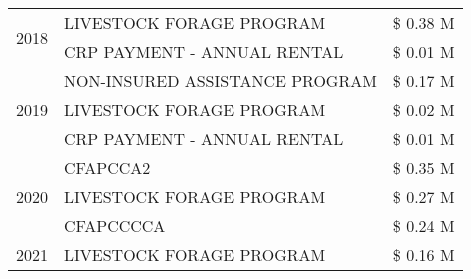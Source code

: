 \begin{tabular}{llr}
\cline{1-3}
\multirow[t]{2}{*}{2018} & LIVESTOCK FORAGE PROGRAM & \$ 0.38 M \\
 & CRP PAYMENT - ANNUAL RENTAL & \$ 0.01 M \\
\cline{1-3}
\multirow[t]{3}{*}{2019} & NON-INSURED ASSISTANCE PROGRAM & \$ 0.17 M \\
 & LIVESTOCK FORAGE PROGRAM & \$ 0.02 M \\
 & CRP PAYMENT - ANNUAL RENTAL & \$ 0.01 M \\
\cline{1-3}
\multirow[t]{3}{*}{2020} & CFAPCCA2 & \$ 0.35 M \\
 & LIVESTOCK FORAGE PROGRAM & \$ 0.27 M \\
 & CFAPCCCCA & \$ 0.24 M \\
\cline{1-3}
2021 & LIVESTOCK FORAGE PROGRAM & \$ 0.16 M \\
\cline{1-3}
\bottomrule
\end{tabular}

